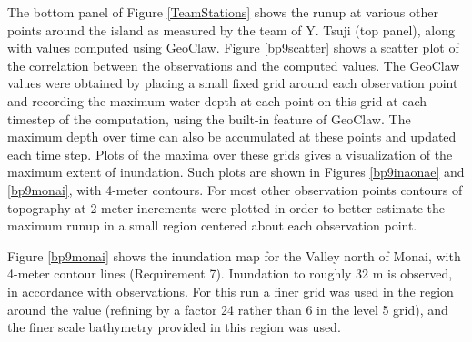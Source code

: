 
The bottom panel of Figure \ref{TeamStations} shows the runup at various other points around the island as measured by the team of Y. Tsuji (top panel), along with values computed using GeoClaw.  Figure \ref{bp9scatter} shows a scatter plot of the correlation between the observations and the computed values.  The GeoClaw values were obtained by placing a small fixed grid around each observation point and recording the maximum water depth at each point on this grid at each timestep of the computation, using the built-in feature of GeoClaw.  The maximum depth over time can also be accumulated at these points and updated each time step.  Plots of the maxima over these grids gives a visualization of the maximum extent of inundation.  Such plots are shown  in Figures \ref{bp9inaonae} and \ref{bp9monai}, with 4-meter contours.  For most other observation  points contours of topography at 2-meter increments were plotted in order to better estimate the maximum runup in a small region centered about each observation point. 

Figure \ref{bp9monai} shows the inundation map for the Valley north of Monai, with 4-meter contour lines (Requirement 7).  Inundation to roughly 32 m is observed, in accordance with observations.  For this run a finer grid was used in the region around the value (refining by a factor 24 rather than 6 in the level 5 grid), and the finer scale bathymetry provided in this region was used.

